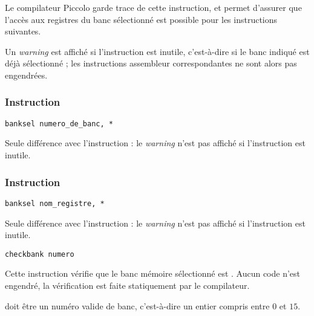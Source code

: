 Le compilateur Piccolo garde trace de cette instruction, et permet d'assurer que l'accès aux registres du banc sélectionné est possible pour les instructions suivantes.

Un \emph{warning} est affiché si l'instruction est inutile, c'est-à-dire si le banc indiqué est déjà sélectionné ; les instructions assembleur correspondantes ne sont alors pas engendrées.




\subsubsection{Instruction }
\begin{lstlisting}[language=piccolo]
banksel numero_de_banc, *
\end{lstlisting}

Seule différence avec l'instruction  : le \emph{warning} n'est pas affiché si l'instruction est inutile.






\subsubsection{Instruction }
\begin{lstlisting}[language=piccolo]
banksel nom_registre, *
\end{lstlisting}

Seule différence avec l'instruction  : le \emph{warning} n'est pas affiché si l'instruction est inutile.










\begin{lstlisting}[language=piccolo]
checkbank numero
\end{lstlisting}

Cette instruction vérifie que le banc mémoire sélectionné est . Aucun code n'est engendré, la vérification est faite statiquement par le compilateur.

 doit être un numéro valide de banc, c'est-à-dire un entier compris entre $0$ et $15$.











